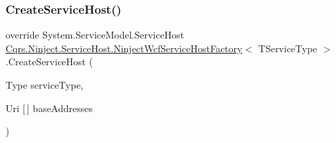 \subsubsection{\texorpdfstring{Create\+Service\+Host()}{CreateServiceHost()}}
{\footnotesize\ttfamily override System.\+Service\+Model.\+Service\+Host \hyperlink{classCqrs_1_1Ninject_1_1ServiceHost_1_1NinjectWcfServiceHostFactory}{Cqrs.\+Ninject.\+Service\+Host.\+Ninject\+Wcf\+Service\+Host\+Factory}$<$ T\+Service\+Type $>$.Create\+Service\+Host (\begin{DoxyParamCaption}\item[{Type}]{service\+Type,  }\item[{Uri \mbox{[}$\,$\mbox{]}}]{base\+Addresses }\end{DoxyParamCaption})\hspace{0.3cm}{\ttfamily [protected]}}

